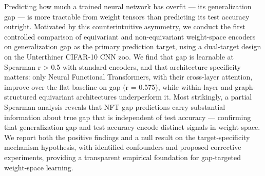 
Predicting how much a trained neural network has overfit --- its generalization gap --- is more tractable
from weight tensors than predicting its test accuracy outright. Motivated by this counterintuitive
asymmetry, we conduct the first controlled comparison of equivariant and non-equivariant weight-space
encoders on generalization gap as the primary prediction target, using a dual-target design on the
Unterthiner CIFAR-10 CNN zoo. We find that gap is learnable at Spearman r > 0.5 with standard encoders,
and that architecture specificity matters: only Neural Functional Transformers, with their cross-layer
attention, improve over the flat baseline on gap (r = 0.575), while within-layer and graph-structured
equivariant architectures underperform it. Most strikingly, a partial Spearman analysis reveals that
NFT gap predictions carry substantial information about true gap that is independent of test accuracy ---
confirming that generalization gap and test accuracy encode distinct signals in weight space. We report
both the positive findings and a null result on the target-specificity mechanism hypothesis, with
identified confounders and proposed corrective experiments, providing a transparent empirical foundation
for gap-targeted weight-space learning.

